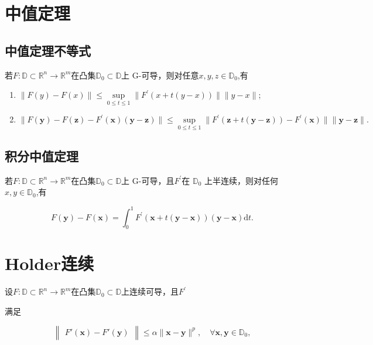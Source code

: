 \documentclass{lzureport}
\begin{document}
\section{中值定理}
\subsection{中值定理不等式}
若$F:\mathbb{D}\subset\mathbb{R}^n\to\mathbb{R}^m$在凸集$\mathbb{D}_0\subset\mathbb{D}$上 G-可导，则对任意$x,y,z\in\mathbb{D}_0$,有

\begin{enumerate}[label=\arabic*)]
	\item $\| F( y) - F( x) \| \leqslant \sup\limits _{0\leqslant t\leqslant 1}\| F^{\prime }( x+ t( y- x) ) \| \| y- x\| ;$
	\item $\| F( \mathbf{y} ) - F( \mathbf{z} ) - F^{\prime }( \mathbf{x} ) ( \mathbf{y} - \mathbf{z} ) \| \leqslant \sup\limits _{0\leq t\leq 1}\| F^{\prime }( \mathbf{z} + t\left ( \mathbf{y} - \boldsymbol{z}\right ) ) - F^{\prime }( \mathbf{x} ) \| \| \mathbf{y} - \boldsymbol{z}\| .$ 
\end{enumerate}

\subsection{积分中值定理}
若$F:\mathbb{D}\subset\mathbb{R}^n\to\mathbb{R}^m$在凸集$\mathbb{D}_0\subset\mathbb{D}$上 G-可导，且$F^\prime$在
$\mathbb{D}_0$ 上半连续，则对任何 $x,y\in\mathbb{D}_0$,有

\begin{equation}\label{eqn:积分中值定理}
F(\mathbf{y})-F(\mathbf{x})=\int_0^1F^{\prime}(\mathbf{x}+t(\mathbf{y}-\mathbf{x}))(\mathbf{y}-\mathbf{x})\mathrm{d}t.
\end{equation}





\section{Holder连续}
设$F:\mathbb{D}\subset\mathbb{R}^n\to\mathbb{R}^m$在凸集$\mathbb{D}_0\subset\mathbb{D}$上连续可导，且$F^\prime$

满足

\begin{equation}\label{eqn:Holder连续}
\begin{Vmatrix}F'(\boldsymbol{x})-F'(\boldsymbol{y})\end{Vmatrix}\leqslant\alpha\|\boldsymbol{x}-\boldsymbol{y}\|^p,\quad\forall\boldsymbol{x},\boldsymbol{y}\in\mathbb{D}_0,
\end{equation}
\end{document}

